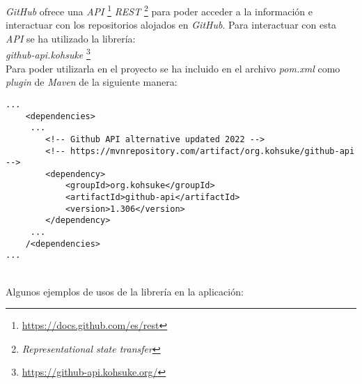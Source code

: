 \textit{GitHub} ofrece una \textit{API} \footnote{\url{https://docs.github.com/es/rest}} \textit{REST} \footnote{\textit{Representational state transfer}} para poder acceder a la información e interactuar con los repositorios alojados en \textit{GitHub}. Para interactuar con esta \textit{API} se ha utilizado la librería:\\

\textit{github-api.kohsuke} \footnote{\url{https://github-api.kohsuke.org/}}\\
Para poder utilizarla en el proyecto se ha incluido en el archivo \textit{pom.xml} como \textit{plugin} de \textit{Maven} de la siguiente manera:

\begin{minipage}{\linewidth}
{\tiny
\begin{verbatim}
...
	<dependencies>
	 ...
		<!-- Github API alternative updated 2022 -->
		<!-- https://mvnrepository.com/artifact/org.kohsuke/github-api -->
		<dependency>
			<groupId>org.kohsuke</groupId>
			<artifactId>github-api</artifactId>
			<version>1.306</version>
		</dependency>
	 ...
	/<dependencies>
...
\end{verbatim}
}
\end{minipage}\\

\newpage
Algunos ejemplos de usos de la librería en la aplicación:

